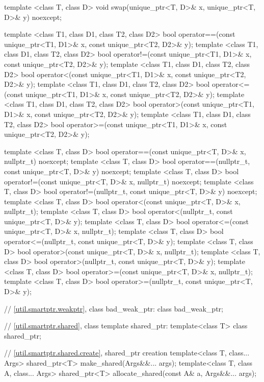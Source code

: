 \begin{codeblock}
{  template <class T, class D> void swap(unique_ptr<T, D>& x, unique_ptr<T, D>& y) noexcept;

  template <class T1, class D1, class T2, class D2>
    bool operator==(const unique_ptr<T1, D1>& x, const unique_ptr<T2, D2>& y);
  template <class T1, class D1, class T2, class D2>
    bool operator!=(const unique_ptr<T1, D1>& x, const unique_ptr<T2, D2>& y);
  template <class T1, class D1, class T2, class D2>
    bool operator<(const unique_ptr<T1, D1>& x, const unique_ptr<T2, D2>& y);
  template <class T1, class D1, class T2, class D2>
    bool operator<=(const unique_ptr<T1, D1>& x, const unique_ptr<T2, D2>& y);
  template <class T1, class D1, class T2, class D2>
    bool operator>(const unique_ptr<T1, D1>& x, const unique_ptr<T2, D2>& y);
  template <class T1, class D1, class T2, class D2>
    bool operator>=(const unique_ptr<T1, D1>& x, const unique_ptr<T2, D2>& y);

  template <class T, class D>
    bool operator==(const unique_ptr<T, D>& x, nullptr_t) noexcept;
  template <class T, class D>
    bool operator==(nullptr_t, const unique_ptr<T, D>& y) noexcept;
  template <class T, class D>
    bool operator!=(const unique_ptr<T, D>& x, nullptr_t) noexcept;
  template <class T, class D>
    bool operator!=(nullptr_t, const unique_ptr<T, D>& y) noexcept;
  template <class T, class D>
    bool operator<(const unique_ptr<T, D>& x, nullptr_t);
  template <class T, class D>
    bool operator<(nullptr_t, const unique_ptr<T, D>& y);
  template <class T, class D>
    bool operator<=(const unique_ptr<T, D>& x, nullptr_t);
  template <class T, class D>
    bool operator<=(nullptr_t, const unique_ptr<T, D>& y);
  template <class T, class D>
    bool operator>(const unique_ptr<T, D>& x, nullptr_t);
  template <class T, class D>
    bool operator>(nullptr_t, const unique_ptr<T, D>& y);
  template <class T, class D>
    bool operator>=(const unique_ptr<T, D>& x, nullptr_t);
  template <class T, class D>
    bool operator>=(nullptr_t, const unique_ptr<T, D>& y);

  // \ref{util.smartptr.weakptr}, class bad_weak_ptr:
  class bad_weak_ptr;

  // \ref{util.smartptr.shared}, class template shared_ptr:
  template<class T> class shared_ptr;

  // \ref{util.smartptr.shared.create}, shared_ptr creation
  template<class T, class... Args> shared_ptr<T> make_shared(Args&&... args);
  template<class T, class A, class... Args>
    shared_ptr<T> allocate_shared(const A& a, Args&&... args);

}
\end{codeblock}
